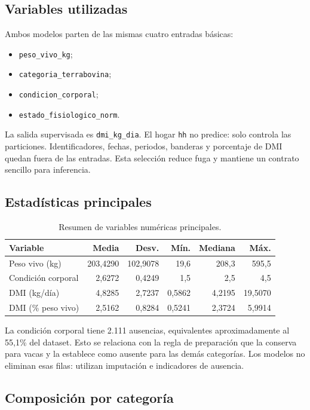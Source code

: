 \documentclass[11pt,a4paper]{article}
\newcommand{\codigo}[1]{\nolinkurl{#1}}
\begin{document}
\subsection{Variables utilizadas}

Ambos modelos parten de las mismas cuatro entradas básicas:
\begin{itemize}
  \item \codigo{peso_vivo_kg};
  \item \codigo{categoria_terrabovina};
  \item \codigo{condicion_corporal};
  \item \codigo{estado_fisiologico_norm}.
\end{itemize}

La salida supervisada es \codigo{dmi_kg_dia}. El hogar \codigo{hh} no predice: solo controla las particiones. Identificadores, fechas, periodos, banderas y porcentaje de DMI quedan fuera de las entradas. Esta selección reduce fuga y mantiene un contrato sencillo para inferencia.

\subsection{Estadísticas principales}

\begin{table}[H]
\centering
\caption{Resumen de variables numéricas principales.}
\begin{tabular}{lrrrrr}
\toprule
\textbf{Variable} & \textbf{Media} & \textbf{Desv.} & \textbf{Mín.} & \textbf{Mediana} & \textbf{Máx.}\\
\midrule
Peso vivo (kg) & 203,4290 & 102,9078 & 19,6 & 208,3 & 595,5\\
Condición corporal & 2,6272 & 0,4249 & 1,5 & 2,5 & 4,5\\
DMI (kg/día) & 4,8285 & 2,7237 & 0,5862 & 4,2195 & 19,5070\\
DMI (\% peso vivo) & 2,5162 & 0,8284 & 0,5241 & 2,3724 & 5,9914\\
\bottomrule
\end{tabular}
\end{table}

La condición corporal tiene 2.111 ausencias, equivalentes aproximadamente al 55,1\% del dataset. Esto se relaciona con la regla de preparación que la conserva para vacas y la establece como ausente para las demás categorías. Los modelos no eliminan esas filas: utilizan imputación e indicadores de ausencia.

\subsection{Composición por categoría}
\end{document}
